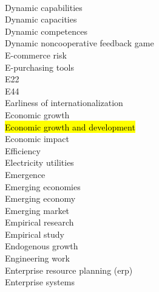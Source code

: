 \documentclass[a4paper]{article}
\begin{document}
\begin{multicols*}{2}
\begin{footnotesize}
\\ Dynamic capabilities \\ Dynamic capacities \\ Dynamic competences \\ Dynamic noncooperative feedback game \\ E-commerce risk \\ E-purchasing tools \\ E22 \\ E44 \\ Earliness of internationalization \\ Economic growth \\ \hl{Economic growth and development} \\ Economic impact \\ Efficiency \\ Electricity utilities \\ Emergence \\ Emerging economies \\ Emerging economy \\ Emerging market \\ Empirical research \\ Empirical study \\ Endogenous growth \\ Engineering work \\ Enterprise resource planning (erp) \\ Enterprise systems
\end{footnotesize}
\end{multicols*}
\end{document}
